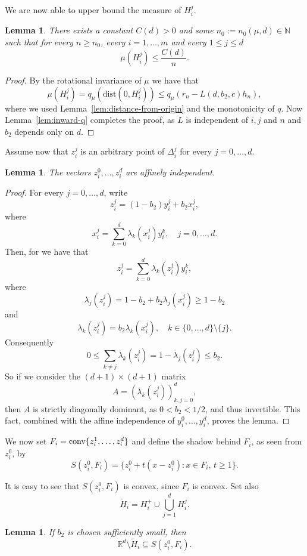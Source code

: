 \documentclass[10pt]{amsart}
\newcommand{\1}{\textbf{1}}
\newcommand{\conv}{{\rm conv}}
\numberwithin{equation}{section} %
\newtheorem{lemma}[theorem]{Lemma}
\theoremstyle{remark}
\theoremstyle{definition}
\begin{document}
We are now able to upper bound the measure of $H_i^j$.

\begin{lemma}\label{lem:Hij-measure-upper-bound}
    There exists a constant \(C(d)>0\) and some $n_0:=n_0(\mu,d) \in \mathbb{N}$  such that for every $n \geq n_0$, every $i=1,\ldots,m$ and every $1 \leq j \leq d$
\[
\mu(H_i^j) \le \frac{C(d)}{n}.
\]
\end{lemma}
\begin{proof}
By the rotational invariance of $\mu$ we have that \[\mu(H_i^j)=q_\mu(\mathrm{dist}(0,H_i^j)) \leq q_\mu(r_n-L(d,b_2,c)h_n),\] where we used Lemma~\ref{lem:distance-from-origin} and the monotonicity of $q$. Now Lemma~\ref{lem:inward-q} completes the proof, as $L$ is independent of $i,j$ and $n$ and $b_2$ depends only on $d$.
\end{proof}

Assume now that $z_i^j$ is an arbitrary point of $\Delta_i^j$ for every $j=0,\ldots,d$.

\begin{lemma}\label{lem:z-affine-independence}
    The vectors $z_i^0,\ldots,z_i^d$ are affinely independent.
\end{lemma}

\begin{proof}
    For every $j=0,\ldots,d$, write \[z_i^j=(1-b_2)y_i^j+b_2x_i^j,\] where \[x_i^j=\sum_{k=0}^d \lambda_k(x_i^j)y_i^k, \quad j=0,\ldots,d.\] Then, for we have that \[z_i^j=\sum_{k=0}^d \lambda_k(z_i^j)y_i^k, \] where \[\lambda_j(z_i^j)=1-b_2+b_2\lambda_j(x_i^j) \geq 1-b_2\] and \[\lambda_k(z_i^j)=b_2\lambda_k(x_i^j), \quad k\in \{0,\ldots,d\} \setminus\{j\}.\] Consequently \[0 \leq \sum_{k \neq j}\lambda_k(z_i^j)=1-\lambda_j(z_i^j)\leq b_2.\] So if we consider the $(d+1) \times (d+1)$ matrix \[A=(\lambda_k(z_i^j))_{k,j=0}^d,\] then  $A$ is strictly diagonally dominant, as $0<b_2<1/2$, and thus invertible. This fact, combined with the affine independence of $y_i^0,\ldots,y_i^d$, proves the lemma.
\end{proof}


We now set $F_i=\conv\{z_i^1,\ldots,z_i^d\}$ and define the shadow behind $F_i$, as seen from $z_i^0$, by \[S(z_i^0,F_i)=\{z_i^0+t(x-z_i^0): x \in F_i, \, t\geq 1\}.\]

It is easy to see that $S(z_i^0,F_i)$ is  convex, since  $F_i$ is convex. Set also \[\widetilde{H}_i=H_i^+ \cup \bigcup_{j=1}^dH_i^j.\]

\begin{lemma}\label{lem:shadow-lemma}
If $b_2$ is chosen sufficiently small, then \[\mathbb{R}^d \setminus \widetilde{H}_i \subseteq S(z_i^0,F_i).\] 
\end{lemma}
\end{document}
